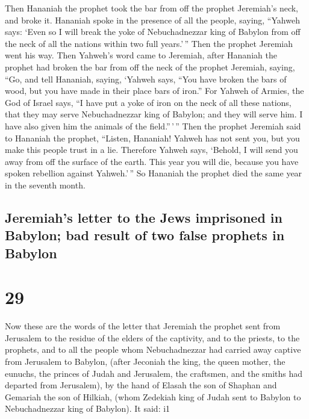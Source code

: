  Then Hananiah the prophet took the bar from off the
prophet Jeremiah's neck, and broke it.  Hananiah spoke in
the presence of all the people, saying, ``Yahweh says: `Even so I will
break the yoke of Nebuchadnezzar king of Babylon from off the neck of
all the nations within two full years.'\,'' Then the prophet Jeremiah
went his way.  Then Yahweh's word came to Jeremiah, after
Hananiah the prophet had broken the bar from off the neck of the prophet
Jeremiah, saying,  ``Go, and tell Hananiah, saying,
`Yahweh says, ``You have broken the bars of wood, but you have made in
their place bars of iron.''  For Yahweh of Armies, the
God of Israel says, ``I have put a yoke of iron on the neck of all these
nations, that they may serve Nebuchadnezzar king of Babylon; and they
will serve him. I have also given him the animals of the field.''\,'\,''
 Then the prophet Jeremiah said to Hananiah the prophet,
``Listen, Hananiah! Yahweh has not sent you, but you make this people
trust in a lie.  Therefore Yahweh says, `Behold, I will
send you away from off the surface of the earth. This year you will die,
because you have spoken rebellion against Yahweh.'\,'' 
So Hananiah the prophet died the same year in the seventh month.

\hypertarget{jeremiahs-letter-to-the-jews-imprisoned-in-babylon-bad-result-of-two-false-prophets-in-babylon}{%
\subsection{Jeremiah's letter to the Jews imprisoned in Babylon; bad
result of two false prophets in
Babylon}\label{jeremiahs-letter-to-the-jews-imprisoned-in-babylon-bad-result-of-two-false-prophets-in-babylon}}

\hypertarget{section-28}{%
\section{29}\label{section-28}}

 Now these are the words of the letter that Jeremiah the
prophet sent from Jerusalem to the residue of the elders of the
captivity, and to the priests, to the prophets, and to all the people
whom Nebuchadnezzar had carried away captive from Jerusalem to Babylon,
 (after Jeconiah the king, the queen mother, the eunuchs,
the princes of Judah and Jerusalem, the craftsmen, and the smiths had
departed from Jerusalem),  by the hand of Elasah the son
of Shaphan and Gemariah the son of Hilkiah, (whom Zedekiah king of Judah
sent to Babylon to Nebuchadnezzar king of Babylon). It said: i1

